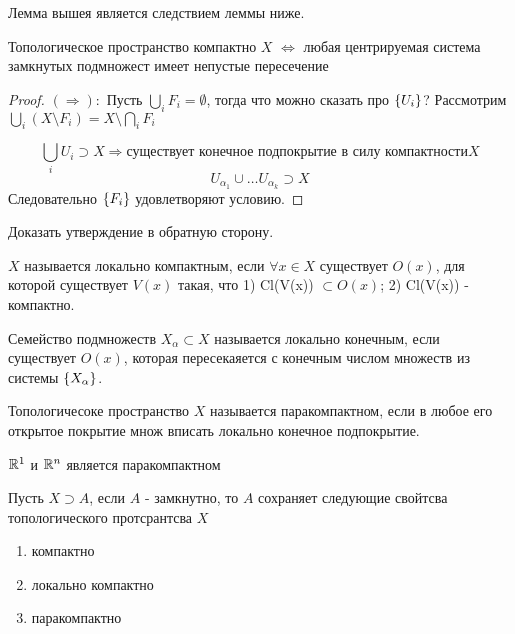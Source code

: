 Лемма вышея является следствием леммы ниже.

\begin{lemma}
    Топологическое пространство компактно $X$ $\Leftrightarrow$ любая центрируемая система замкнутых подмножест имеет непустые пересечение 
\end{lemma}
\begin{proof}
    $(\Rightarrow):$ Пусть $\bigcup_i F_i = \emptyset$, тогда что можно сказать про $\left\{U_i\right\}$? Рассмотрим $\bigcup_i (X \setminus F_i) = X \setminus \bigcap_i F_i$

    \[
        \bigcup_i U_i \supset X \Rightarrow \text{существует конечное подпокрытие в силу компактности} X
    \]
    \[
        U_{\alpha_1} \cup \ldots U_{\alpha_k} \supset X
    \]
    Следовательно $\left\{F_i\right\}$ удовлетворяют условию.
\end{proof}

\begin{exercise}
    Доказать утверждение в обратную сторону.
\end{exercise}

\begin{definition}
    $X$ называется локально компактным, если $\forall x \in X$ существует $O(x)$, для которой существует $V(x)$ такая, что 1) Cl(V(x)) $\subset O(x)$; 2) Cl(V(x)) - компактно.
\end{definition}

\begin{definition}
    Семейство подмножеств $X_{\alpha} \subset X$ называется локально конечным, если существует $O(x)$, которая пересекаяется с конечным числом множеств из системы $\left\{X_{\alpha}\right\}$.
\end{definition}

\begin{definition}
    Топологичесоке пространство $X$ называется паракомпактном, если в любое его открытое покрытие множ вписать локально конечное подпокрытие.
\end{definition}

\begin{example}
    $\mathbb{R}^1$ и $\mathbb{R}^n$ является паракомпактном
\end{example}

\begin{lemma}
    Пусть $X \supset A$, если $A$ - замкнутно, то $A$ сохраняет следующие свойтсва топологического протсрантсва $X$
    \begin{enumerate}
        \item компактно
        \item локально компактно
        \item паракомпактно
    \end{enumerate}
\end{lemma}

